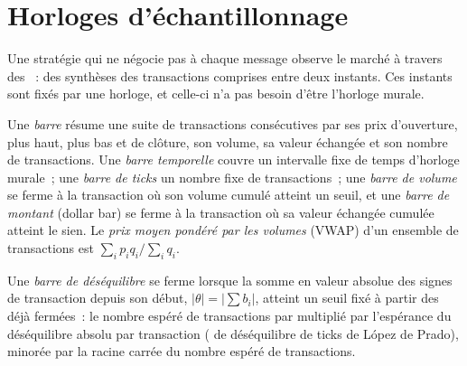\section{Horloges d'échantillonnage}

Une stratégie qui ne négocie pas à chaque message observe le marché à travers des ~: des synthèses des transactions comprises entre deux
instants. Ces instants sont fixés par une horloge, et celle-ci n'a pas besoin d'être l'horloge murale.

\begin{definition}\label{def:rs:market-data-for-research:bar}
Une \emph{barre} résume une suite de transactions consécutives par ses prix d'ouverture, plus haut, plus bas et de clôture, son volume, sa valeur
échangée et son nombre de transactions. Une \emph{barre temporelle} couvre un intervalle fixe de temps d'horloge murale~; une \emph{barre de
ticks} un nombre fixe de transactions~; une \emph{barre de volume} se ferme à la transaction où son volume cumulé
atteint un seuil, et une \emph{barre de montant} (dollar bar) se ferme à la transaction où sa valeur échangée cumulée atteint le sien.
Le \emph{prix moyen pondéré par les volumes} (VWAP) d'un ensemble de transactions est $\sum_i p_iq_i/\sum_i q_i$.
\end{definition}

\begin{definition}\label{def:rs:market-data-for-research:imbalance}
Une \emph{barre de déséquilibre} se ferme lorsque la somme en valeur absolue des signes de transaction depuis son début, $|\theta| =
|\sum b_i|$, atteint un seuil fixé à partir des  déjà fermées~: le nombre espéré de transactions par  multiplié par
l'espérance du déséquilibre absolu par transaction ( de déséquilibre de ticks de López de Prado), minorée par la racine carrée du nombre espéré de transactions.
\end{definition}

